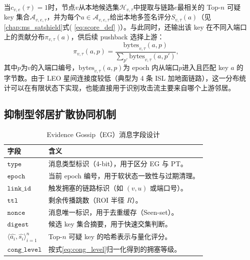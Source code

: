 当$c_{v,e}(\tau)=1$时，节点$v$从本地候选集$\mathcal{H}_{v,\tau}$中提取与链路$e$最相关的 Top-$n$ 可疑 key 集合$\mathcal{A}_{v,e,\tau}$，并为每个$a\in\mathcal{A}_{v,e,\tau}$给出本地多签名评分$S_{v,\tau}(a)$（见\ref{chap:ms_satshield}式( \ref{eq:score_def} )）。与此同时，还输出该 key 在不同入端口上的贡献分布$\pi_{v,\tau}(a)$，供后续 pushback 选择上游：
\begin{equation}
\pi_{v,\tau}(a,p)=\frac{\text{bytes}_{v,\tau}(a,p)}{\sum_{p'}\text{bytes}_{v,\tau}(a,p')},
\label{eq:ingress_contrib}
\end{equation}
其中$p$为$v$的入端口编号，$\text{bytes}_{v,\tau}(a,p)$为 epoch 内从端口$p$进入且匹配 key $a$ 的字节数。由于 LEO 星间连接度较低（典型为 4 条 ISL 加地面链路），这一分布统计可以在有限状态下实现，也能直接用于识别攻击流主要来自哪个上游邻居。

\subsection{抑制型邻居扩散协同机制}
\label{subsec:ch4_gossip}

\begin{table}[t]
\centering
\caption{Evidence Gossip（EG）消息字段设计}
\label{tab:msg_format}
\small
\begin{tabular}{@{}
>{\raggedright\arraybackslash}p{3.4cm}
>{\raggedright\arraybackslash}p{8.1cm}
@{}}
\toprule
\textbf{字段} & \textbf{含义} \\
\midrule
$\texttt{type}$ & 消息类型标识（4-bit），用于区分 EG 与 PT。 \\

$\texttt{epoch}$ & 当前 epoch 编号，用于软状态一致性与过期清理。 \\

$\texttt{link\_id}$ & 触发拥塞的链路标识（如 $(v,u)$ 或端口号）。 \\

$\texttt{ttl}$ & 剩余传播跳数（ROI 半径 $R$）。 \\

$\texttt{nonce}$ & 消息唯一标识，用于去重缓存（Seen-set）。 \\

$\texttt{digest}$ & 候选 key 集合摘要，用于快速交集判断。 \\

$\langle \widehat{a_i}, \widehat{s_i}\rangle_{i=1}^{n}$ & Top-$n$ 可疑 key 的哈希表示与量化评分。 \\

$\texttt{cong\_level}$ & 按式\eqref{eq:cong_level}归一化得到的拥塞等级。 \\
\bottomrule
\end{tabular}

\end{table}

